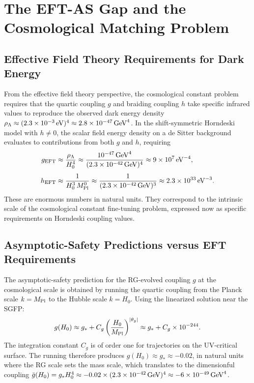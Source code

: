 \documentclass[12pt,a4paper]{article}
\begin{document}
\section{The EFT-AS Gap and the Cosmological Matching Problem}
\label{sec:eft_as_gap}

\subsection{Effective Field Theory Requirements for Dark Energy}

From the effective field theory perspective, the cosmological constant problem
requires that the quartic coupling $g$ and braiding coupling $h$ take specific
infrared values to reproduce the observed dark energy density
$\rho_\Lambda \approx (2.3\times 10^{-3}\,{\rm eV})^4 \approx 2.8\times 10^{-47}\,{\rm GeV}^4$.
In the shift-symmetric Horndeski model with $h \neq 0$, the scalar field energy
density on a de Sitter background evaluates to contributions from both $g$ and
$h$, requiring \cite{EichhornLinoWagner2023}
\begin{align}
g_{\rm EFT}
&\approx \frac{\rho_\Lambda}{H_0^4}
\approx \frac{10^{-47}\,{\rm GeV}^4}{(2.3\times 10^{-42}\,{\rm GeV})^4}
\approx 9\times 10^7\,{\rm eV}^{-4},
\\[4pt]
h_{\rm EFT}
&\approx \frac{1}{H_0^3\,M_{\rm Pl}^0}
\approx \frac{1}{(2.3\times 10^{-42}\,{\rm GeV})^3}
\approx 2.3\times 10^{33}\,{\rm eV}^{-3}.
\end{align}
These are enormous numbers in natural units. They correspond to the intrinsic
scale of the cosmological constant fine-tuning problem, expressed now as
specific requirements on Horndeski coupling values.

\subsection{Asymptotic-Safety Predictions versus EFT Requirements}

The asymptotic-safety prediction for the RG-evolved coupling $g$ at the
cosmological scale is obtained by running the quartic coupling from the
Planck scale $k = M_{\rm Pl}$ to the Hubble scale $k = H_0$. Using the
linearized solution near the SGFP:
\begin{equation}
g(H_0)
\approx g_* + C_g\left(\frac{H_0}{M_{\rm Pl}}\right)^{|\theta_g|}
\approx g_* + C_g\times 10^{-244}.
\end{equation}
The integration constant $C_g$ is of order one for trajectories on the
UV-critical surface. The running therefore produces
$g(H_0) \approx g_* \approx -0.02$, in natural units where the RG scale
sets the mass scale, which translates to the dimensionful coupling
$\bar g(H_0) = g_* H_0^4 \approx -0.02\times (2.3\times 10^{-42}\,{\rm GeV})^4
\approx -6\times 10^{-49}\,{\rm GeV}^4$.
\end{document}
